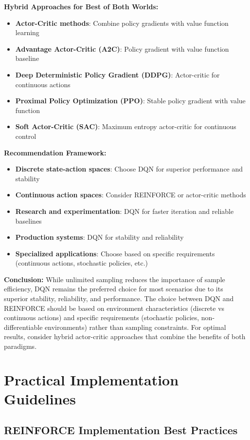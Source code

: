 \documentclass[12pt]{article}
\begin{document}
{{{\textbf{Hybrid Approaches for Best of Both Worlds:}
\begin{itemize}
    \item \textbf{Actor-Critic methods}: Combine policy gradients with value function learning
    \item \textbf{Advantage Actor-Critic (A2C)}: Policy gradient with value function baseline
    \item \textbf{Deep Deterministic Policy Gradient (DDPG)}: Actor-critic for continuous actions
    \item \textbf{Proximal Policy Optimization (PPO)}: Stable policy gradient with value function
    \item \textbf{Soft Actor-Critic (SAC)}: Maximum entropy actor-critic for continuous control
\end{itemize}

\textbf{Recommendation Framework:}
\begin{itemize}
    \item \textbf{Discrete state-action spaces}: Choose DQN for superior performance and stability
    \item \textbf{Continuous action spaces}: Consider REINFORCE or actor-critic methods
    \item \textbf{Research and experimentation}: DQN for faster iteration and reliable baselines
    \item \textbf{Production systems}: DQN for stability and reliability
    \item \textbf{Specialized applications}: Choose based on specific requirements (continuous actions, stochastic policies, etc.)
\end{itemize}

\textbf{Conclusion:}
While unlimited sampling reduces the importance of sample efficiency, DQN remains the preferred choice for most scenarios due to its superior stability, reliability, and performance. The choice between DQN and REINFORCE should be based on environment characteristics (discrete vs continuous actions) and specific requirements (stochastic policies, non-differentiable environments) rather than sampling constraints. For optimal results, consider hybrid actor-critic approaches that combine the benefits of both paradigms.

\section{Practical Implementation Guidelines}

\subsection{REINFORCE Implementation Best Practices}

}}}
\end{document}
